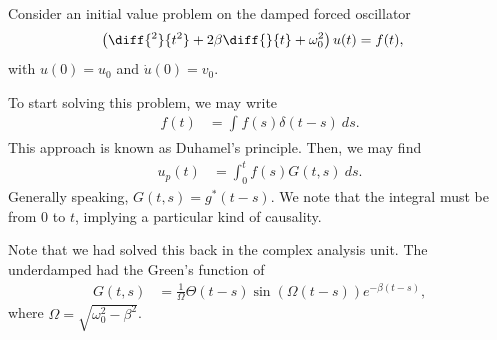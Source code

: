 \documentclass[10pt]{mypackage}
\begin{document}
  \begin{example}
    Consider an initial value problem on the damped forced oscillator
    \begin{align*}
      \left( \diff{^2}{t^2} + 2\beta \diff{}{t} + \omega_0^2 \right)u(t) &= f(t),
    \end{align*}
    with $u(0) = u_0$ and $\dot{u}(0)= v_0$.\newline

    To start solving this problem, we may write
    \begin{align*}
      f(t) &= \int_{}^{} f(s)\delta\left( t-s \right)\:ds.
    \end{align*}
    This approach is known as Duhamel's principle. Then, we may find
    \begin{align*}
      u_p(t) &= \int_{0}^{t} f\left( s \right)G\left( t,s \right)\:ds.
    \end{align*}
    Generally speaking, $G\left( t,s \right) = g^{\ast}\left( t-s \right)$. We note that the integral must be from $0$ to $t$, implying a particular kind of causality.\newline

    Note that we had solved this back in the complex analysis unit. The underdamped had the Green's function of
    \begin{align*}
      G\left( t,s \right) &= \frac{1}{\Omega}\Theta\left( t-s \right)\sin\left( \Omega\left( t-s \right) \right)e^{-\beta\left( t-s \right)},
    \end{align*}
    where $\Omega = \sqrt{\omega_0^2 - \beta^2}$.
  \end{example}
\end{document}
